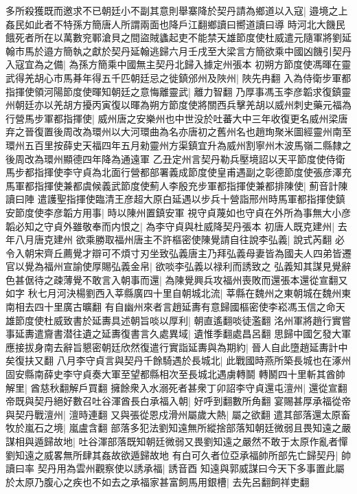 多所殺獲既而邀求不已朝廷小不副其意則舉寨降於契丹請為鄉道以入寇|{
	邉境之上姦民如此者不特孫方簡唐人所謂兩面也降戶江翻鄉讀曰嚮道讀曰導}
時河北大饑民餓死者所在以萬數兖鄆滄貝之間盜賊蠭起吏不能禁天雄節度使杜威遣元隨軍將劉延翰市馬於邉方簡執之獻於契丹延翰逃歸六月壬戌至大梁言方簡欲乘中國凶饑引契丹入寇宜為之備|{
	為孫方簡乘中國無主契丹北歸入據定州張本}
初朔方節度使馮暉在靈武得羌胡心市馬朞年得五千匹朝廷忌之徙鎮邠州及陜州|{
	陜先冉翻}
入為侍衛步軍都指揮使領河陽節度使暉知朝廷之意悔離靈武|{
	離力智翻}
乃厚事馮玉李彦韜求復鎮靈州朝廷亦以羌胡方擾丙寅復以暉為朔方節度使將關西兵擊羌胡以威州刺史藥元福為行營馬步軍都指揮使|{
	威州唐之安樂州也中世没於吐蕃大中三年收復更名威州梁唐弃之晉復置後周改為環州以大河環曲為名亦唐初之舊州名也趙珣聚米圖經靈州南至環州五百里按薛史天福四年五月勑靈州方渠鎮宜升為威州割寧州木波馬嶺二縣隸之後周改為環州顯德四年降為通遠軍}
乙丑定州言契丹勒兵壓境詔以天平節度使侍衛馬步都指揮使李守貞為北面行營都部署義成節度使皇甫遇副之彰德節度使張彦澤充馬軍都指揮使兼都虞候義武節度使薊人李殷充步軍都指揮使兼都排陳使|{
	薊音計陳讀曰陣}
遣護聖指揮使臨清王彦超大原白延遇以步兵十營詣邢州時馬軍都指揮使鎮安節度使李彦韜方用事|{
	時以陳州置鎮安軍}
視守貞蔑如也守貞在外所為事無大小彦韜必知之守貞外雖敬奉而内恨之|{
	為李守貞與杜威降契丹張本}
初唐人既克建州|{
	去年八月唐克建州}
欲乘勝取福州唐主不許樞密使陳覺請自往說李弘義|{
	說式芮翻}
必令入朝宋齊丘薦覺才辯可不煩寸刃坐致弘義唐主乃拜弘義母妻皆為國夫人四弟皆遷官以覺為福州宣諭使厚賜弘義金帛|{
	欲啖李弘義以禄利而誘致之}
弘義知其謀見覺辭色甚倨待之疎薄覺不敢言入朝事而還|{
	為陳覺興兵攻福州喪敗而還張本還從宣翻又如字}
秋七月河決楊劉西入莘縣廣四十里自朝城北流|{
	莘縣在魏州之東朝城在魏州東南相去四十里廣古曠翻}
有自幽州來者言趙延夀有意歸國樞密使李崧馮玉信之命天雄節度使杜威致書於延夀具述朝旨啖以厚利|{
	朝直遙翻啖徒濫翻}
洺州軍將趙行實嘗事延夀遣齎書潜往遺之延夀復書言久處異域|{
	遺惟季翻處昌呂翻}
思歸中國乞發大軍應接拔身南去辭旨懇密朝廷欣然復遣行實詣延夀與為期約|{
	晉人自此墮趙延夀計中矣復扶又翻}
八月李守貞言與契丹千餘騎遇於長城北|{
	此戰國時燕所築長城也在涿州固安縣南薛史李守貞奏大軍至望都縣相次至長城北遇虜轉鬬}
轉鬭四十里斬其酋帥解里|{
	酋慈秋翻解戶買翻}
擁餘衆入水溺死者甚衆丁卯詔李守貞還屯澶州|{
	還從宣翻}
帝既與契丹絕好數召吐谷渾酋長白承福入朝|{
	好呼到翻數所角翻}
宴賜甚厚承福從帝與契丹戰澶州|{
	澶時連翻}
又與張從恩戍滑州屬歲大熱|{
	屬之欲翻}
遣其部落還太原畜牧於嵐石之境|{
	嵐盧含翻}
部落多犯法劉知遠無所縱捨部落知朝廷微弱且畏知遠之嚴謀相與遁歸故地|{
	吐谷渾部落既知朝廷微弱又畏劉知遠之嚴然不敢于太原作亂者憚劉知遠之威畧無所肆其姦故欲遁歸故地}
有白可久者位亞承福帥所部先亡歸契丹|{
	帥讀曰率}
契丹用為雲州觀察使以誘承福|{
	誘音酉}
知遠與郭威謀曰今天下多事置此屬於太原乃腹心之疾也不如去之承福家甚富飼馬用銀槽|{
	去先呂翻飼祥吏翻}
